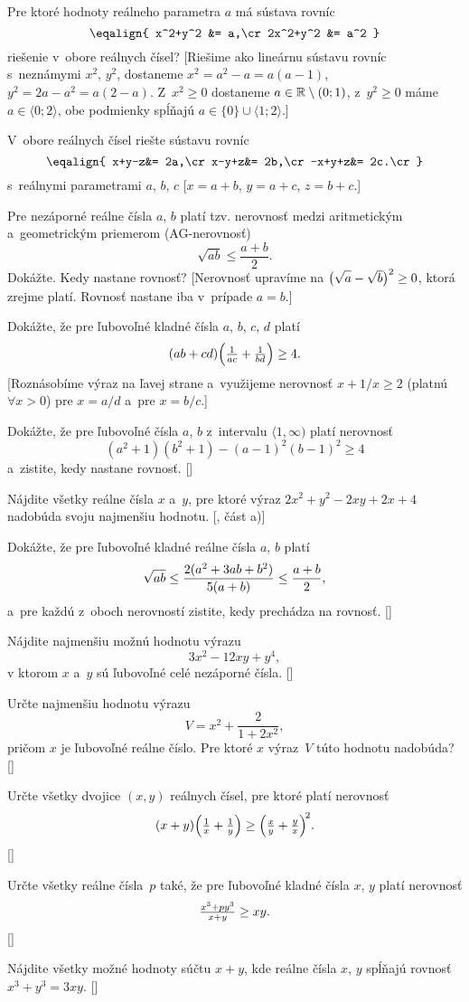 {
Pre ktoré hodnoty reálneho parametra $a$ má sústava rovníc
$$
\eqalign{
x^2+y^2 &= a,\cr
2x^2+y^2 &= a^2
}$$
riešenie v~obore reálnych čísel?
[Riešime ako lineárnu sústavu rovníc s~neznámymi $x^2$, $y^2$,
dostaneme $x^2=a^2-a=a(a-1)$, $y^2=2a-a^2=a(2-a)$. Z~$x^2\ge0$
dostaneme $a\in\Bbb R\setminus(0;1)$, z~$y^2\ge0$ máme
$a\in\langle0;2\rangle$, obe podmienky spĺňajú $a\in\{0\}\cup\langle1;2\rangle$.]

V~obore reálnych čísel riešte sústavu rovníc
$$
\eqalign{
x+y-z&= 2a,\cr
x-y+z&= 2b,\cr
-x+y+z&= 2c.\cr
}$$
s~reálnymi parametrami $a$, $b$, $c$ [$x=a+b$, $y=a+c$, $z=b+c$.]

Pre nezáporné reálne čísla $a$, $b$ platí tzv. nerovnosť medzi
aritmetickým a~geometrickým priemerom (AG-nerovnosť)
$$
\sqrt{ab}\le \frac{a+b}2.
$$
Dokážte. Kedy nastane rovnosť?
[Nerovnosť upravíme na $\big(\sqrt{\vphantom{b}a}-\sqrt b\big)^2\ge0$, ktorá
zrejme platí. Rovnosť nastane iba v~prípade $a=b$.]

Dokážte, že pre ľubovoľné kladné čísla $a$, $b$, $c$, $d$ platí
$$(ab + cd)\Bigl(\frac1{ac}+\frac1{bd}\Bigr)\ge 4.$$
[Roznásobíme výraz na ľavej strane a~využijeme nerovnosť $x+1/x\ge2$
(platnú $\forall x>0$) pre $x=a/d$ a~pre $x=b/c$.]

\D
Dokážte, že pre ľubovoľné čísla $a$, $b$ z~intervalu $\langle 1,\infty)$
platí nerovnosť
$$
(a^2+1)(b^2+1) - (a-1)^2 (b-1)^2 \ge 4
$$
a~zistite, kedy nastane rovnosť. []

Nájdite všetky reálne čísla $x$ a~$y$, pre ktoré výraz $2x^2 + y^2- 2xy + 2x + 4$ nadobúda svoju
najmenšiu hodnotu. [, část a)]

Dokážte, že pre ľubovoľné kladné reálne čísla $a$, $b$ platí
$$
\sqrt{ab}\le{2(a^2+3ab+b^2)\over5(a+b)}\le{a+b\over2},
$$
a~pre každú z~oboch nerovností zistite, kedy prechádza na rovnosť.
[]

Nájdite najmenšiu možnú hodnotu výrazu
$$
3x^2-12xy+y^4,
$$
v ktorom $x$ a~$y$ sú ľubovoľné celé nezáporné čísla.
[]

Určte najmenšiu hodnotu výrazu
$$
V=x^2+\frac2{1+2x^2},
$$
pričom $x$ je ľubovoľné reálne číslo. Pre ktoré $x$ výraz~$V$ túto hodnotu nadobúda? []

Určte všetky dvojice $(x, y)$ reálnych čísel, pre ktoré platí nerovnosť
$$
\belowdisplayskip 0pt
(x + y)\Bigl(\frac1x+\frac1y\Bigr)\ge\Bigl(\frac xy+\frac yx\Bigr)^{\!2}.
$$
[]

Určte všetky reálne čísla~$p$ také, že pre ľubovoľné kladné
čísla $x$, $y$ platí nerovnosť
$$
\belowdisplayskip 0pt
\frac{x^3+py^3}{x+y}\geq xy.
$$
[]

Nájdite všetky možné hodnoty súčtu $x+y$,
kde reálne čísla $x$, $y$ spĺňajú rovnosť $x^3+y^3=3xy$. []
}


